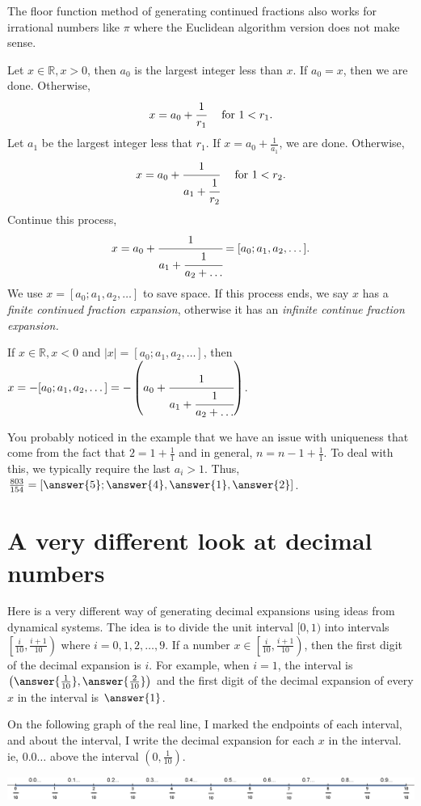 \documentclass{ximera}
\begin{document}
The floor function method of generating continued fractions also works for irrational numbers like $\pi$ where the Euclidean algorithm version does not make sense. 
\begin{definition}
 Let $x\in\mathbb{R},x>0$, then $a_0$ is the largest integer less than $x$. If $a_0=x$, then we are done. Otherwise,
\[x=a_0+\cfrac{1}{r_1}\quad\textrm{ for }1<r_1.\] 
Let $a_1$ be the largest integer less that $r_1$. If $x=a_0+\frac{1}{a_1}$, we are done. Otherwise,
\[x=a_0+\cfrac{1}{a_1+\cfrac{1}{r_2}}\quad\textrm{ for }1<r_2.\] 
Continue this process, 
\[x=a_0+\cfrac{1}{a_1+\cfrac{1}{a_2+\dots}}=[a_0;a_1,a_2,\dots].\]
We use $x=[a_0;a_1,a_2,\dots]$ to save space.
If this process ends, we say $x$ has a \emph{finite continued fraction expansion}, otherwise it has an \emph{infinite continue fraction expansion.}

If $x\in\mathbb{R}, x<0$ and $|x|=[a_0;a_1,a_2,\dots]$, then $x=-[a_0;a_1,a_2,\dots]=-\left(a_0+\cfrac{1}{a_1+\cfrac{1}{a_2+\dots}}\right)$.
\end{definition}

You probably noticed in the example that we have an issue with uniqueness that come from the fact that $2=1+\frac{1}{1}$ and in general, $n=n-1+\frac{1}{1}$. To deal with this, we typically require the last $a_i>1$.
Thus, $\frac{803}{154}=[\answer{5};\answer{4},\answer{1},\answer{2}]$.

\section*{A very different look at decimal numbers}
Here is a very different way of generating decimal expansions using ideas from dynamical systems. The idea is to divide the unit interval $[0,1)$ into intervals $\left[\frac{i}{10},\frac{i+1}{10}\right)$ where $i=0,1,2,\dots,9$. If a number $x\in\left[\frac{i}{10},\frac{i+1}{10}\right)$, then the first digit of the decimal expansion is $i$. For example, when $i=1$, the interval is $\left(\answer{\frac{1}{10}},\answer{\frac{2}{10}}\right)$ and the first digit of the decimal expansion of every $x$ in the interval is $\answer{1}$. 

On the following graph of the real line, I marked the endpoints of each interval, and about the interval, I write the decimal expansion for each $x$ in the interval. ie, $0.0\dots$ above the interval $\left(0,\frac{1}{10}\right)$.

\begin{image}
 \includegraphics[width=\textwidth]{decimalcylinder.eps}
\end{image}
\end{document}
